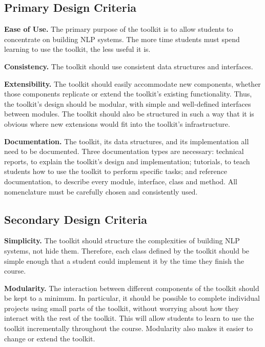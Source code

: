 \documentclass[11pt]{article}
\begin{document}
\subsection{Primary Design Criteria}

\noindent\textbf{Ease of Use.} The primary purpose of the toolkit is
to allow students to concentrate on building NLP systems.  The more
time students must spend learning to use the toolkit, the less useful
it is.

\noindent\textbf{Consistency.} The toolkit should use consistent data
structures and interfaces.

\noindent\textbf{Extensibility.} The toolkit should easily
accommodate new components, whether those components replicate or
extend the toolkit's existing functionality.  Thus, the toolkit's
design should be modular, with simple and well-defined interfaces
between modules.  The toolkit should also be structured in such a way
that it is obvious where new extensions would fit into the toolkit's
infrastructure.

\noindent\textbf{Documentation.} The toolkit, its data structures,
and its implementation all need to be documented.  Three documentation
types are necessary: technical reports, to explain the toolkit's
design and implementation; tutorials, to teach students how to use the
toolkit to perform specific tasks; and reference documentation, to
describe every module, interface, class and method.  All nomenclature
must be carefully chosen and consistently used.

\subsection{Secondary Design Criteria}

\noindent\textbf{Simplicity.} The toolkit should structure the
complexities of building NLP systems, not hide them.  Therefore, each
class defined by the toolkit should be simple enough that a student
could implement it by the time they finish the course.

\noindent\textbf{Modularity.} The interaction between different
components of the toolkit should be kept to a minimum.  In particular,
it should be possible to complete individual projects using small
parts of the toolkit, without worrying about how they interact with
the rest of the toolkit.  This will allow students to learn to use the
toolkit incrementally throughout the course.  Modularity also makes it
easier to change or extend the toolkit.
\end{document}
